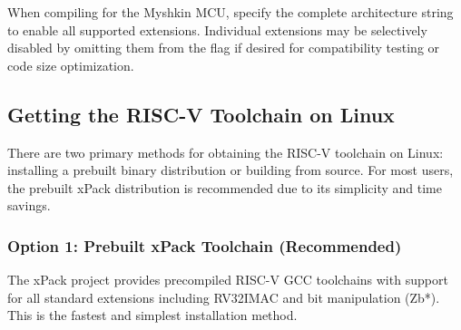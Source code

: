 \documentclass[11pt,pdftex,portrait,letterpaper]{article}
\begin{document}
When compiling for the Myshkin MCU, specify the complete architecture string \\  to enable all supported extensions. Individual extensions may be selectively disabled by omitting them from the  flag if desired for compatibility testing or code size optimization.

\subsection{Getting the RISC-V Toolchain on Linux} \label{ss:linuxinstall}
There are two primary methods for obtaining the RISC-V toolchain on Linux: installing a prebuilt binary distribution or building from source. For most users, the prebuilt xPack distribution is recommended due to its simplicity and time savings.

\subsubsection{Option 1: Prebuilt xPack Toolchain (Recommended)}

The xPack project provides precompiled RISC-V GCC toolchains with support for all standard extensions including RV32IMAC and bit manipulation (Zb*). This is the fastest and simplest installation method.
\end{document}
